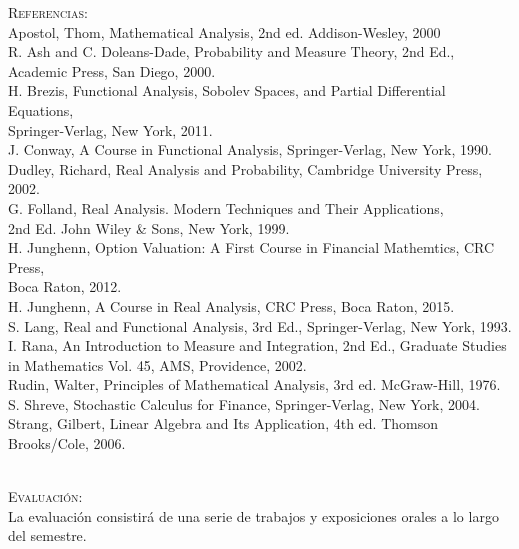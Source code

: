 \documentclass[12pt,letterpaper]{article}
\newcommand\tab[1][1.5cm]{\hspace*{#1}}
\begin{document}
\textsc{Referencias}: \\
\tab Apostol, Thom, Mathematical Analysis, 2nd ed. Addison-Wesley, 2000\\
\tab R. Ash and C. Doleans-Dade, Probability and Measure Theory, 2nd Ed., \\
\tab \qquad \qquad Academic Press, San Diego, 2000.\\
\tab H. Brezis, Functional Analysis, Sobolev Spaces, and Partial Differential Equations, \\
\tab \qquad \qquad Springer-Verlag, New York, 2011.\\
\tab J. Conway, A Course in Functional Analysis, Springer-Verlag, New York, 1990.\\
\tab Dudley, Richard, Real Analysis and Probability, Cambridge University
Press, 2002.\\
\tab G. Folland, Real Analysis. Modern Techniques and Their Applications, \\
\tab \qquad \qquad 2nd Ed. John Wiley \& Sons, New York, 1999.\\
\tab H. Junghenn, Option Valuation: A First Course in Financial Mathemtics, CRC Press,\\
\tab \qquad \qquad Boca Raton, 2012.\\
\tab H. Junghenn, A Course in Real Analysis, CRC Press, Boca Raton, 2015.\\
\tab S. Lang, Real and Functional Analysis, 3rd Ed., Springer-Verlag, New York, 1993.\\
\tab I. Rana, An Introduction to Measure and Integration, 2nd Ed., Graduate Studies \\
\tab \qquad \qquad in Mathematics Vol. 45, AMS, Providence, 2002.\\
\tab Rudin, Walter, Principles of Mathematical Analysis, 3rd ed. McGraw-Hill,
1976.\\
\tab S. Shreve, Stochastic Calculus for Finance, Springer-Verlag, New York, 2004.\\
\tab Strang, Gilbert, Linear Algebra and Its Application, 4th ed. Thomson \\
\tab \qquad \qquad  Brooks/Cole, 2006.\\

\

\textsc{Evaluación}: \\
\tab La evaluación consistirá de una serie de trabajos y exposiciones orales a lo largo \\
\tab del semestre.
\end{document}
